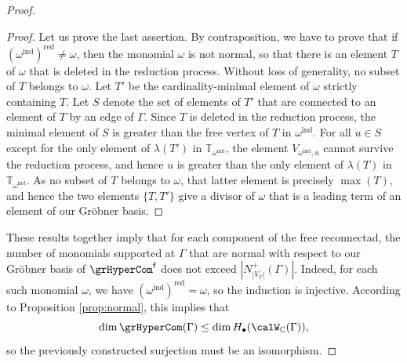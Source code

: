 \begin{proof}
\begin{proof}
Let us prove the last assertion. By contraposition, we have to prove that if $(\omega^{\mathrm{ind}})^{\mathrm{red}}\neq\omega$, then the monomial $\omega$ is not normal, so that there is an element $T$ of $\omega$ that is deleted in the reduction process. Without loss of generality, no subset of $T$ belongs to $\omega$. Let $T'$ be the cardinality-minimal element of $\omega$ strictly containing $T$. Let $S$ denote  the set of elements of $T'$ that are connected to an element of $T$ by an edge of $\Gamma$. Since $T$ is deleted in the reduction process, the minimal element of $S$ is greater than the free vertex of $T$ in $\omega^{\mathrm{ind}}$. For all $u\in S$ except for the only element of $\lambda(T')$ in $\mathbb{T}_{\omega^{\mathrm{ind}}}$, the element $V_{\omega^{\mathrm{ind}},u}$ cannot survive the reduction process, and hence $u$ is greater than the only element of $\lambda(T)$ in $\mathbb{T}_{\omega^{\mathrm{ind}}}$. As no subset of $T$ belongs to $\omega$, that latter element is precisely $\max(T)$, and hence the two elements $\{T,T'\}$ give a divisor of $\omega$ that is a leading term of an element of our Gr\"obner basis. 
\end{proof}

These results together imply that for each component of the free reconnectad, the number of monomials supported at $\Gamma$ that are normal with respect to our Gr\"obner basis of $\grHyperCom^{\mathsf{f}}$ does not exceed $|N^+_{|V_\Gamma|}(\Gamma)|$. Indeed, for each such monomial $\omega$,
we have $(\omega^{\mathrm{ind}})^{\mathrm{red}}=\omega$, so the induction is injective. According to Proposition \ref{prop:normal}, this implies that
 \[
\dim \grHyperCom(\Gamma) \leq \dim H_{\bullet}(\calW_{\mathbb{C}}(\Gamma)),
 \]
so the previously constructed surjection must be an isomorphism. 
\end{proof}
